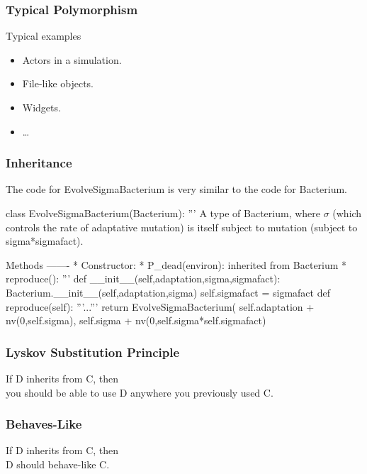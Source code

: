 \begin{frame}[fragile]
\frametitle{Typical Polymorphism}
\begin{block}{Typical examples}
\begin{itemize}
\item Actors in a simulation.
\item File-like objects.
\item Widgets.
\item \ldots
\end{itemize}
\end{block}
\end{frame}

\begin{frame}[fragile]
\frametitle{Inheritance}

The code for EvolveSigmaBacterium is very similar to the code for Bacterium.

\end{frame}

\begin{frame}[fragile]

\begin{python}
class EvolveSigmaBacterium(Bacterium):
    '''
    A type of Bacterium, where $\sigma$ (which controls
    the rate of adaptative mutation) is itself subject
    to mutation (subject to sigma*sigmafact).

    Methods
    -------
        * Constructor:
        * P_dead(environ): inherited from Bacterium
        * reproduce(): 
    '''
    def __init__(self,adaptation,sigma,sigmafact):
        Bacterium.__init__(self,adaptation,sigma)
        self.sigmafact = sigmafact
    def reproduce(self):
        '''...'''
        return EvolveSigmaBacterium(
           self.adaptation + nv(0,self.sigma),
           self.sigma + nv(0,self.sigma*self.sigmafact)
\end{python}
\end{frame}

\begin{frame}[fragile]
\frametitle{Lyskov Substitution Principle}

If D inherits from C, then\\
you should be able to use D anywhere you previously used C.

\end{frame}

\begin{frame}[fragile]
\frametitle{Behaves-Like}

If D inherits from C, then\\
D should behave-like C.

\end{frame}

